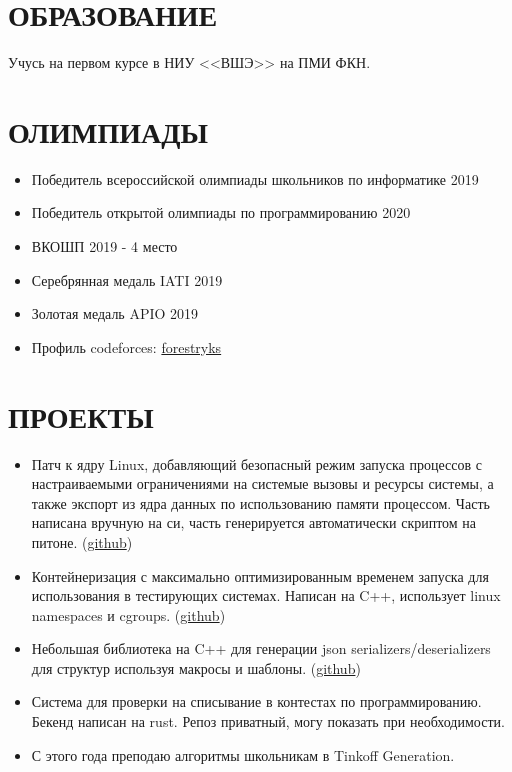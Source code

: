 \documentclass[margin, 10pt]{res} %
\begin{document}
\begin{resume}

\newsectionwidth{100pt}

\section{ОБРАЗОВАНИЕ}

Учусь на первом курсе в НИУ <<ВШЭ>> на ПМИ ФКН.

\section{ОЛИМПИАДЫ}

\begin{itemize}
	\item Победитель всероссийской олимпиады школьников по информатике 2019
	\item Победитель открытой олимпиады по программированию 2020
	\item ВКОШП 2019 - 4 место
	\item Серебрянная медаль IATI 2019
	\item Золотая медаль APIO 2019
	\item Профиль codeforces: \href{https://codeforces.com/profile/forestryks}{forestryks}
\end{itemize}

\section{ПРОЕКТЫ}

\begin{itemize}
	\item Патч к ядру Linux, добавляющий безопасный режим запуска процессов с настраиваемыми ограничениями на системые вызовы и ресурсы системы, а также экспорт из ядра данных по использованию памяти процессом. Часть написана вручную на си, часть генерируется автоматически скриптом на питоне. (\href{https://github.com/forestryks/kJudge}{github})
	\item Контейнеризация с максимально оптимизированным временем запуска для использования в тестирующих системах. Написан на C++, использует linux namespaces и cgroups. (\href{https://github.com/forestryks/libsbox}{github})
	\item Небольшая библиотека на C++ для генерации json serializers/deserializers для структур используя макросы и шаблоны. (\href{https://github.com/forestryks/json-model}{github})
	\item Система для проверки на списывание в контестах по программированию. Бекенд написан на rust. Репоз приватный, могу показать при необходимости.
	\item С этого года преподаю алгоритмы школьникам в Tinkoff Generation.
\end{itemize}


\end{resume}
\end{document}
